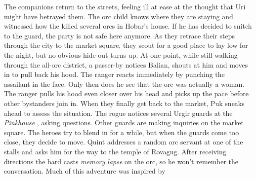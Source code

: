 The companions return to the streets, feeling ill at ease at the thought that Uri might have betrayed them. The orc child knows where they are staying and witnessed how the killed several orcs in Hobar's house. If he has decided to snitch to the guard, the party is not safe here anymore. As they retrace their steps through the city to the market square, they scout for a good place to lay low for the night, but no obvious hide-out turns up. At one point, while still walking through the all-orc district, a passer-by notices Balian, shouts at him and moves in to pull back his hood. The ranger reacts immediately by punching the assailant in the face. Only then does he see that the orc was actually a woman. The ranger pulls his hood even closer over his head and picks up the pace before other bystanders join in. When they finally get back to the market, Puk sneaks ahead to assess the situation. The rogue notices several Urgir guards at the {\itshape Pinkhouse} , asking questions. Other guards are making inquiries on the market square. The heroes try to blend in for a while, but when the guards come too close, they decide to move. Quint addresses a random orc servant at one of the stalls and asks him for the way to the temple of Rovagug. After receiving directions the bard casts  {\itshape memory lapse} on the orc, so he won't remember the conversation. Much of this adventure was inspired by 